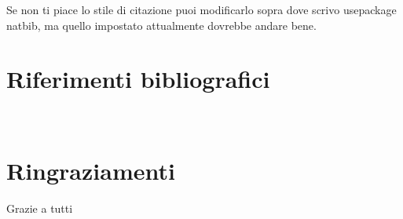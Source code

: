 \documentclass[12pt,a4paper,twoside]{book}
\begin{document}
Se non ti piace lo stile di citazione puoi modificarlo sopra dove scrivo usepackage natbib, ma quello impostato attualmente dovrebbe andare bene.



\renewcommand{\bibsection}{}
\chapter*{Riferimenti bibliografici}

\newpage

\renewcommand{\appendixtocname}{Appendici}
\renewcommand{\appendixpagename}{Appendici}
{}

\newpage~\newpage
\chapter*{Ringraziamenti}
Grazie a tutti
\end{document}
